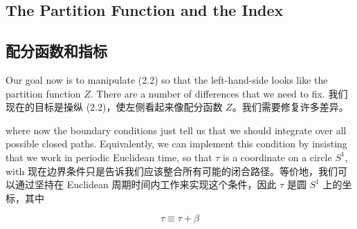 \documentclass{ctexart}
\begin{document}
\begin{paracol}{2}
\subsection{The Partition Function and the Index}
\switchcolumn
\subsection*{配分函数和指标}
\switchcolumn*

Our goal now is to manipulate (2.2) so that the left-hand-side looks like the partition function $Z$. There are a number of differences that we need to fix.
\switchcolumn
我们现在的目标是操纵 (2.2)，使左侧看起来像配分函数 $Z$。我们需要修复许多差异。
\switchcolumn*

where now the boundary conditions just tell us that we should integrate over all possible closed paths. Equivalently, we can implement this condition by insisting that we work in periodic Euclidean time, so that $\tau$ is a coordinate on a circle $S^1$, with
\switchcolumn
现在边界条件只是告诉我们应该整合所有可能的闭合路径。等价地，我们可以通过坚持在 Euclidean 周期时间内工作来实现这个条件，因此 $\tau$ 是圆 $S^1$ 上的坐标，其中
\end{paracol}

\[ \tau \equiv \tau + \beta \]
\end{document}
